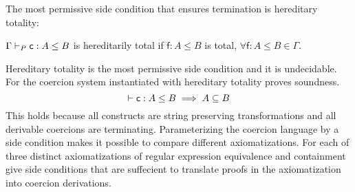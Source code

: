 The most permissive side condition that ensures termination is hereditary totality:
\begin{definition}
$\Gamma \vdash_P \mathsf{c} : A \leq B$ is hereditarily total if $\mathsf{f}: A \leq B$ is total, $\forall \mathsf{f} : A \leq B \in \Gamma$.
\end{definition}
Hereditary totality is the most permissive side condition and it is undecidable. For the coercion system instantiated with hereditary totality \cite{HN11} proves soundness. 
\[ \vdash \mathsf{c} : A \leq B \implies A \subseteq B\]
This holds because all constructs are string preserving transformations and all derivable coercions are terminating.
Parameterizing the coercion language by a side condition makes it possible to compare different axiomatizations. For each of three distinct axiomatizations of regular expression equivalence and containment \cite{HN11} give side conditions that are suffecient to translate proofs in the axiomatization into coercion derivations.
